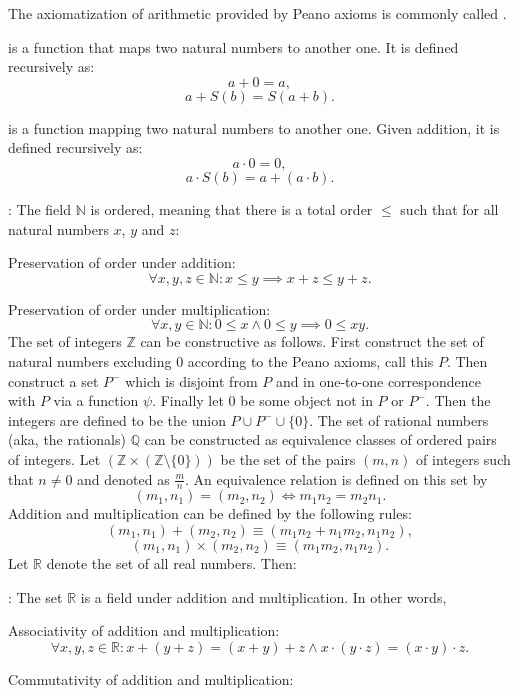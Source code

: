 \documentclass[a4paper,12pt]{article}
\begin{document}
The axiomatization of arithmetic provided by Peano axioms is commonly called .
\bit
\item {} is a function that maps two natural numbers to another one. It is defined recursively as:
\[a+0=a,\]
\[a+S(b)=S(a+b).\]
\item {} is a function mapping two natural numbers to another one. Given addition, it is defined recursively as:
\[a\cdot 0=0,\]
\[a\cdot S(b)=a+(a\cdot b).\]
\item {}: The field $\mathbb{N}$ is ordered, meaning that there is a total order $\leq$ such that for all natural numbers $x$, $y$ and $z$:
\bit
\item Preservation of order under addition:
\[\forall x,y,z\in\mathbb{N}\colon x\leq y\implies x+z\leq y+z.\]
\item Preservation of order under multiplication:
\[\forall x,y\in\mathbb{N}\colon 0\leq x\land 0\leq y\implies 0\leq xy.\]
\eit
\eit
{}
The set of integers $\mathbb{Z}$ can be constructive as follows. First construct the set of natural numbers excluding $0$ according to the Peano axioms, call this $P$. Then construct a set $P^-$ which is disjoint from $P$ and in one-to-one correspondence with $P$ via a function $\psi$. Finally let $0$ be some object not in $P$ or $P^-$. Then the integers are defined to be the union $P\cup P^{-}\cup \{0\}$.
The set of rational numbers (aka, the rationals) $\mathbb{Q}$ can be constructed as equivalence classes of ordered pairs of integers. Let $(\mathbb {Z} \times (\mathbb {Z} \setminus \{0\}))$⁠ be the set of the pairs $(m, n)$ of integers such that $n \neq 0$ and denoted as $\frac{m}{n}$. An equivalence relation is defined on this set by
\[(m_{1},n_{1})=(m_{2},n_{2})\iff m_{1}n_{2}=m_{2}n_{1}.\]
Addition and multiplication can be defined by the following rules:
\[(m_{1},n_{1})+(m_{2},n_{2})\equiv (m_{1}n_{2}+n_{1}m_{2},n_{1}n_{2}),\]
\[(m_{1},n_{1})\times (m_{2},n_{2})\equiv (m_{1}m_{2},n_{1}n_{2}).\]
Let $\mathbb{R}$ denote the set of all real numbers. Then:
\bit
\item {}: The set $\mathbb{R}$ is a field under addition and multiplication. In other words,
\bit
\item Associativity of addition and multiplication:
\[\forall x,y,z\in\mathbb{R}\colon x+(y+z)=(x+y)+z\land x\cdot(y\cdot z)=(x\cdot y)\cdot z.\]
\item Commutativity of addition and multiplication:
\end{document}
